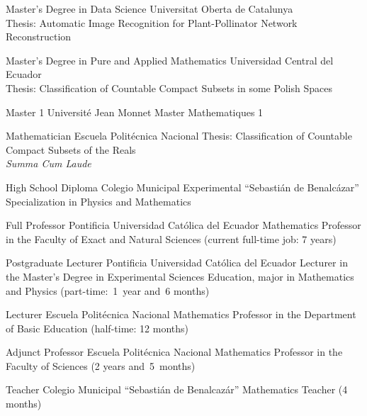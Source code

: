 \documentclass[
    a4paper,
    maincolor=cvblue!70!blue,
    sidecolor=gray!30,
    sectioncolor=cvblue!70!blue,
    sidebarwidth=7.5cm,
    topbottommargin=20pt,
    leftrightmargin=20pt,
]{fortysecondscv}
\begin{document}
\makefrontsidebar

    {Master's Degree in Data Science}
    {Universitat Oberta de Catalunya}
    {\hspace{0pt}\\[-1mm] Thesis: Automatic Image Recognition for Plant-Pollinator Network Reconstruction\\[-1.5mm]}

    {Master's Degree in Pure and Applied Mathematics}
    {Universidad Central del Ecuador}
    {\hspace{0pt}\\[-1mm] Thesis: Classification of Countable Compact Subsets in some Polish Spaces}

    {Master 1}
    {Université Jean Monnet}
    {Master Mathematiques 1}
    
    {Mathematician}
    {Escuela Politécnica Nacional}
    {Thesis: Classification of Countable Compact Subsets of the Reals\\ \textit{Summa Cum Laude}}
    
    {High School Diploma}
    {Colegio Municipal Experimental ``Sebastián de Benalcázar''}
    {Specialization in Physics and Mathematics}

    {Full Professor}
    {Pontificia Universidad Católica del Ecuador}
    {Mathematics Professor in the Faculty of Exact and Natural Sciences (current full-time job: 7 years)}
    
    {Postgraduate Lecturer}
    {Pontificia Universidad Católica del Ecuador}
    {Lecturer in the Master's Degree in Experimental Sciences Education, major in Mathematics and Physics (part-time:~1~year and~6 months)}

    {Lecturer}
    {Escuela Politécnica Nacional}
    {Mathematics Professor in the Department of Basic Education (half-time: 12 months)}

    {Adjunct Professor}
    {Escuela Politécnica Nacional}
    {Mathematics Professor in the Faculty of Sciences (2 years and~5~months)}

    {Teacher}
    {Colegio Municipal ``Sebastián de Benalcazár''}
    {Mathematics Teacher (4 months)}
\end{document}
